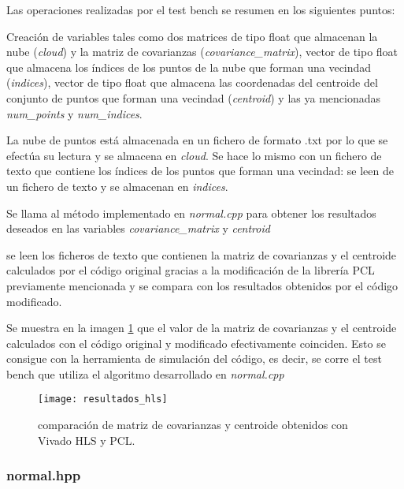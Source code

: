 Las operaciones realizadas por el test bench se resumen en los siguientes puntos:

\begin{list}{•}
\item Creación de variables tales como dos matrices de tipo float que almacenan la nube (\textit{cloud}) y la matriz de covarianzas (\textit{covariance\_matrix}), vector de tipo float que almacena los índices de los puntos de la nube que forman una vecindad (\textit{indices}), vector de tipo float que almacena las coordenadas del centroide del conjunto de puntos que forman una vecindad (\textit{centroid}) y las ya mencionadas \textit{num\_points} y \textit{num\_indices}.

\item La nube de puntos está almacenada en un fichero de formato .txt por lo que se efectúa su lectura y se almacena en \textit{cloud}. Se hace lo mismo con un fichero de texto que contiene los índices de los puntos que forman una vecindad: se leen de un fichero de texto y se almacenan en \textit{indices}.

\item Se llama al método implementado en \textit{normal.cpp} para obtener los resultados deseados en las variables \textit{covariance\_matrix} y \textit{centroid}

\item se leen los ficheros de texto que contienen la matriz de covarianzas y el centroide calculados por el código original gracias a la modificación de la librería PCL previamente mencionada y se compara con los resultados obtenidos por el código modificado.
\end{list}

Se muestra en la imagen \ref{fig:resultados_hls} que el valor de la matriz de covarianzas y el centroide calculados con el código original y modificado efectivamente coinciden. Esto se consigue con la herramienta de simulación del código, es decir, se corre el test bench que utiliza el algoritmo desarrollado en \textit{normal.cpp}

\begin{figure}
\centering
\texttt{[image: resultados\_hls]}
\caption{comparación de matriz de covarianzas y centroide obtenidos con Vivado HLS y PCL.}\label{fig:resultados_hls}
\end{figure}



\subsubsection{normal.hpp}

